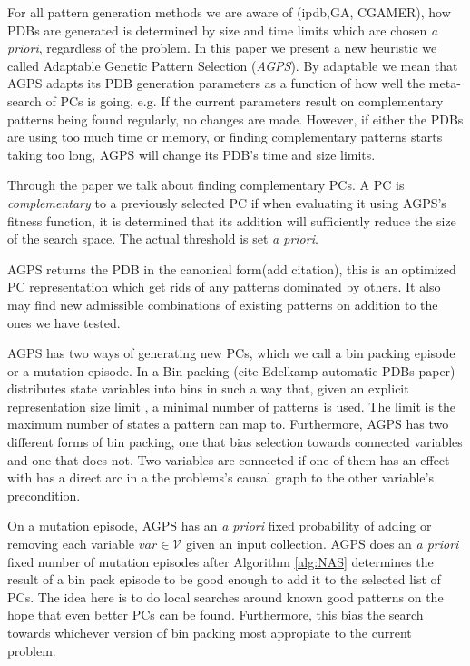 \documentclass{article}
\newcommand{\mc}{\mathcal}
\begin{document}
For all pattern generation methods we are aware of (ipdb,GA, CGAMER), how PDBs are generated is determined by size and time limits which are chosen \emph{a priori}, regardless of the problem.  In this paper we present a new heuristic we called Adaptable Genetic Pattern Selection (\emph{AGPS}).  By adaptable we mean that AGPS adapts its PDB generation parameters as a function of how well the meta-search of PCs is going, e.g. If the current parameters result on complementary patterns being found regularly, no changes are made.  However, if either the PDBs are using too much time or memory, or finding complementary patterns starts taking too long, AGPS will change its PDB's time and size limits.

Through the paper we talk about finding complementary PCs.  A PC is \emph{complementary} to a previously selected PC if when evaluating it using AGPS's fitness function, it is determined that its addition will sufficiently reduce the size of the search space.  The actual threshold is set \emph{a priori}.

AGPS returns the PDB in the canonical form(add citation), this is an optimized PC representation which get rids of any patterns dominated by others.  It also may find new admissible combinations of existing patterns on addition to the ones we have tested.

AGPS has two ways of generating new PCs, which we call a bin packing episode or a mutation episode.  In a Bin packing (cite Edelkamp automatic PDBs paper) distributes state variables into bins in such a way that, given an explicit representation size limit , a minimal number of patterns is used.  The limit is the maximum number of states a pattern can map to.  Furthermore, AGPS has two different forms of bin packing, one that bias selection towards connected variables and one that does not.  Two variables are connected if one of them has an effect with has a direct arc in a the problems's causal graph to the other variable's precondition.  

On a mutation episode, AGPS has an \emph{a priori} fixed probability of adding or removing each variable $var \in \mc{V}$ given an input collection.  AGPS does an \emph{a priori} fixed number of mutation episodes after Algorithm \ref{alg:NAS} determines the result of a bin pack episode to be good enough to add it to the selected list of PCs.  The idea here is to do local searches around known good patterns on the hope that even better PCs can be found.  Furthermore, this bias the search towards whichever version of bin packing most appropiate to the current problem.
\end{document}
